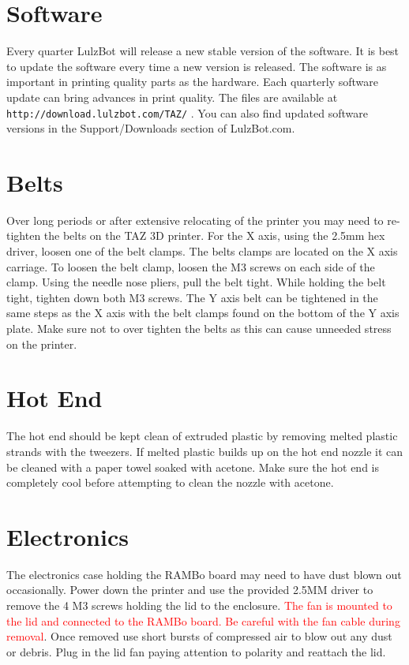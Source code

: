 \section{Software}
Every quarter LulzBot will release a new stable version of the software. It is best to update the software every time a new version is released. The software is as important in printing quality parts as the hardware. Each quarterly software update can bring advances in print quality. The files are available at \texttt{http://download.lulzbot.com/TAZ/} . You can also find updated software versions in the Support/Downloads section of LulzBot.com.

\section{Belts}
Over long periods or after extensive relocating of the printer you may need to re-tighten the belts on the TAZ 3D printer. For the X axis, using the 2.5mm hex driver, loosen one of the belt clamps. The belts clamps are located on the X axis carriage. To loosen the belt clamp, loosen the M3 screws on each side of the clamp. Using the needle nose pliers, pull the belt tight. While holding the belt tight, tighten down both M3 screws. The Y axis belt can be tightened in the same steps as the X axis with the belt clamps found on the bottom of the Y axis plate. Make sure not to over tighten the belts as this can cause unneeded stress on the printer.

\section{Hot End}
The hot end should be kept clean of extruded plastic by removing melted plastic strands with the tweezers. If melted plastic builds up on the hot end nozzle it can be cleaned with a paper towel soaked with acetone. Make sure the hot end is completely cool before attempting to clean the nozzle with acetone.


\section{Electronics}
The electronics case holding the RAMBo board may need to have dust blown out occasionally. Power down the printer and use the provided 2.5MM driver to remove the 4 M3 screws holding the lid to the enclosure. \textcolor{red}{The fan is mounted to the lid and connected to the RAMBo board. Be careful with the fan cable during removal}. Once removed use short bursts of compressed air to blow out any dust or debris. Plug in the lid fan paying attention to polarity and reattach the lid.
